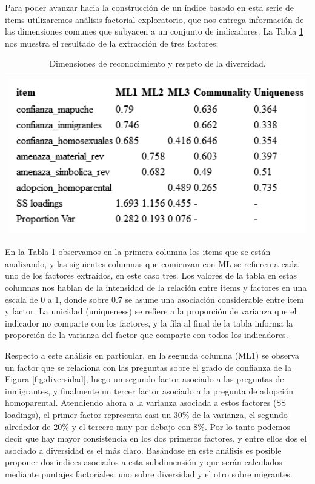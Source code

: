 \documentclass[
  12pt,
]{book}
\begin{document}
Para poder avanzar hacia la construcción de un índice basado en esta serie de items utilizaremos análisis factorial exploratorio, que nos entrega información de las dimensiones comunes que subyacen a un conjunto de indicadores. La Tabla \ref{tab:div-fa} nos muestra el resultado de la extracción de tres factores:

\begin{longtable}[]{@{}l@{}}
\caption{\label{tab:div-fa}Dimensiones de reconocimiento y respeto de la diversidad.}\tabularnewline
\toprule
\endhead
\includegraphics[width=5.20833in,height=\textheight]{output/tables/div_fa.png} \\
\bottomrule
\end{longtable}

En la Tabla \ref{tab:div-fa} observamos en la primera columna los items que se están analizando, y las siguientes columnas que comienzan con ML se refieren a cada uno de los factores extraídos, en este caso tres. Los valores de la tabla en estas columnas nos hablan de la intensidad de la relación entre items y factores en una escala de 0 a 1, donde sobre 0.7 se asume una asociación considerable entre item y factor. La unicidad (uniqueness) se refiere a la proporción de varianza que el indicador no comparte con los factores, y la fila al final de la tabla informa la proporción de la varianza del factor que comparte con todos los indicadores.

Respecto a este análisis en particular, en la segunda columna (ML1) se observa un factor que se relaciona con las preguntas sobre el grado de confianza de la Figura \ref{fig:diversidad}, luego un segundo factor asociado a las preguntas de inmigrantes, y finalmente un tercer factor asociado a la pregunta de adopción homoparental. Atendiendo ahora a la varianza asociada a estos factores (SS loadings), el primer factor representa casi un 30\% de la varianza, el segundo alrededor de 20\% y el tercero muy por debajo con 8\%. Por lo tanto podemos decir que hay mayor consistencia en los dos primeros factores, y entre ellos dos el asociado a diversidad es el más claro. Basándose en este análisis es posible proponer dos índices asociados a esta subdimensión y que serán calculados mediante puntajes factoriales: uno sobre diversidad y el otro sobre migrantes.
\end{document}

